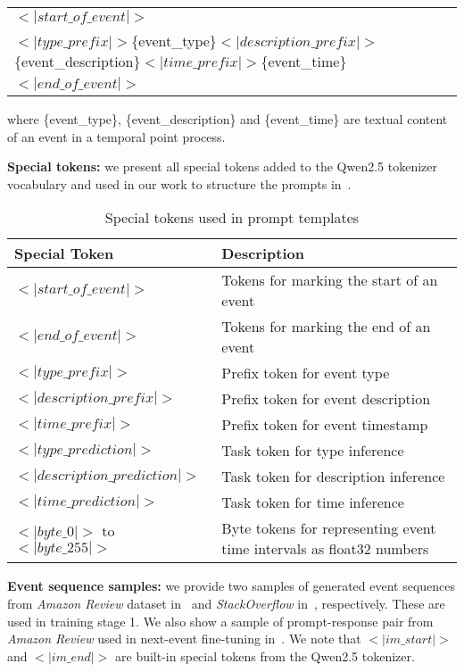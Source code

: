 \begin{table}[h]
\small
\begin{tabular}{|p{}|}
\hline
$<|start\_of\_event|>$\\
$<|type\_prefix|>$\{event\_type\}$<|description\_prefix|>$\{event\_description\}$<|time\_prefix|>$\{event\_time\}\\
$<|end\_of\_event|>$ \\
\hline
\end{tabular}
\end{table}
where \{event\_type\}, \{event\_description\} and \{event\_time\} are textual content of an event in a temporal point process.

\textbf{Special tokens:} we present all special tokens added to the Qwen2.5 tokenizer vocabulary and used in our work to structure the prompts in~.

\begin{table}[h]
\small
\centering
\begin{tabular}{|l|p{}|}
\hline
\textbf{Special Token} & \textbf{Description} \\
\hline
$<|start\_of\_event|>$ & Tokens for marking the start of an event \\
$<|end\_of\_event|>$ & Tokens for marking the end of an event \\
\hline
$<|type\_prefix|>$ & Prefix token for event type \\
$<|description\_prefix|>$ & Prefix token for event description \\
$<|time\_prefix|>$ & Prefix token for event timestamp \\
\hline
$<|type\_prediction|>$ & Task token for type inference \\
$<|description\_prediction|>$ & Task token for description inference \\
$<|time\_prediction|>$ & Task token for time inference \\
\hline
$<|byte\_0|>$ to $<|byte\_255|>$ & Byte tokens for representing event time intervals as float32 numbers \\
\hline
\end{tabular}
\caption{Special tokens used in prompt templates}
\label{tab:special_tokens}
\end{table}



\textbf{Event sequence samples:} we provide two samples of generated event sequences from \textit{Amazon Review} dataset in~ and \textit{StackOverflow} in~, respectively. These are used in training stage 1. We also show a sample of prompt-response pair from \textit{Amazon Review} used in next-event fine-tuning in~. We note that $<|im\_start|>$ and $<|im\_end|>$ are built-in special tokens from the Qwen2.5 tokenizer.

